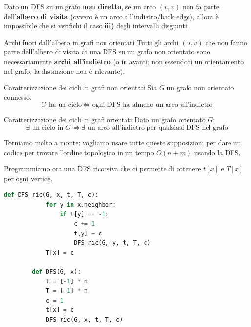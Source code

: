 \documentclass[12pt]{report}
\begin{document}
	\begin{proposizione}{}{}
		Dato un DFS su un grafo \textbf{non diretto}, se un arco $(u, v)$ non fa parte dell'\textbf{albero di visita} (ovvero è un arco all'indietro/back edge), allora è impossibile che si verifichi il caso \textbf{iii)} degli intervalli disgiunti.
	\end{proposizione}
	
	\begin{osservazione}{Archi fuori dall'albero in grafi non orientati}{}
		Tutti gli archi $(u, v)$ che non fanno parte dell'albero di visita di una DFS su un grafo non orientato sono necessariamente \textbf{archi all'indietro} (o in avanti; non essendoci un orientamento nel grafo, la distinzione non è rilevante).
	\end{osservazione}
	
	\begin{proposizione}{Caratterizzazione dei cicli in grafi non orientati}{}
		Sia $G$ un grafo non orientato connesso.
		\[
		G \text{ ha un ciclo} \iff \text{ogni DFS ha almeno un arco all'indietro}
		\]
	\end{proposizione}
	
	\begin{proposizione}{Caratterizzazione dei cicli in grafi orientati}{}
		Dato un grafo orientato $G$:
		\[
		\exists \text{ un ciclo in } G \iff \exists \text{ un arco all'indietro per qualsiasi DFS nel grafo}
		\]
	\end{proposizione}
	
	Torniamo molto a monte: vogliamo usare tutte queste supposizioni per dare un codice per trovare l'ordine topologico in un tempo $O(n+m)$ usando la DFS.
	
	Programmiamo ora una DFS ricorsiva che ci permette di ottenere $t[x]$ e $T[x]$ per ogni vertice.
	
	\begin{lstlisting}[style=stile-listings, language=Python]
		def DFS_ric(G, x, t, T, c):
			for y in x.neighbor:
				if t[y] == -1:
					c += 1
					t[y] = c
					DFS_ric(G, y, t, T, c)
			T[x] = c
		
		def DFS(G, x):
			t = [-1] * n
			T = [-1] * n
			c = 1
			t[x] = c
			DFS_ric(G, x, t, T, c)
	\end{lstlisting}
	
\end{document}
